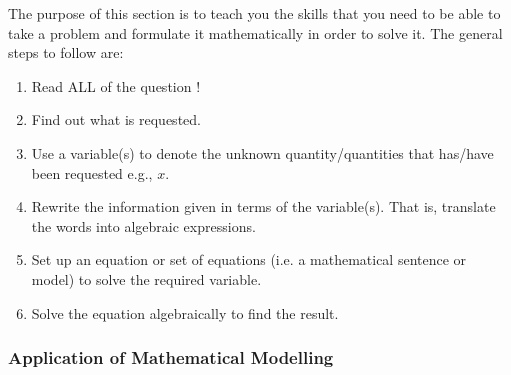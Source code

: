         
        \label{m39262*id161898}The purpose of this section is to teach you the skills that you need to be able to take a problem and formulate it mathematically in order to solve it. The general steps to follow are:\par 
        \label{m39262*id161903}\begin{enumerate}[noitemsep, label=\textbf{\arabic*}. ] 
            \label{m39262*uid104}\item Read ALL of the question !
\label{m39262*uid105}\item Find out what is requested.
\label{m39262*uid106}\item Use a variable(s) to denote the unknown quantity/quantities that has/have been requested e.g., \begin{math}x\end{math}.
\label{m39262*uid107}\item Rewrite the information given in terms of the variable(s). That is, translate the words into algebraic expressions. 
\label{m39262*uid108}\item Set up an equation or set of equations (i.e. a mathematical sentence or model) to solve the required variable.
\label{m39262*uid109}\item Solve the equation algebraically to find the result.
\end{enumerate}
        

      
      \label{m39262*uid110}
            \subsubsection{ Application of Mathematical Modelling}
            \nopagebreak
            \par
            \label{m39262*secfhsst!!!underscore!!!id6176}\vspace{.5cm} 
      
